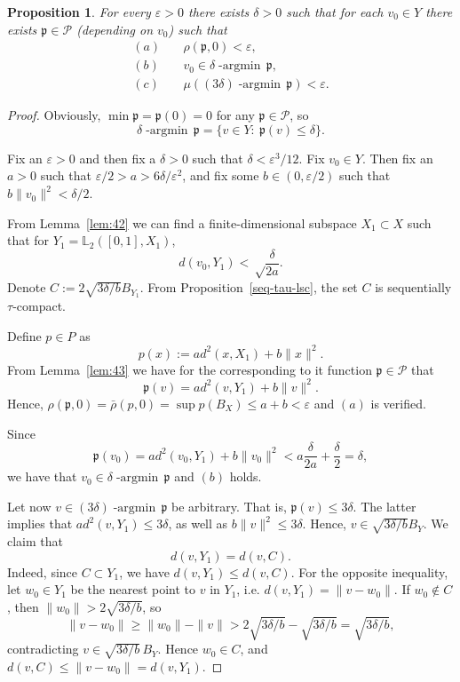 \documentclass[12pt,leqno]{article}
\newtheorem{prop}[thm]{Proposition}   %
\theoremstyle{definition}
\theoremstyle{remark}
\def\L{\mathbb{L}}
\DeclareMathOperator*{\argmin}{-argmin\,}
\begin{document}
    \begin{prop}
        \label{prop:41}
        For every $\varepsilon > 0$ there exists $\delta>0$ such that for each $v_0\in Y$   there exists $\mathfrak{p}\in \mathcal{P}$ (depending on $v_0$)   such that
      \[  \begin{aligned}
            (a)\quad & \rho(\mathfrak{p}, 0) < \varepsilon, \\
            (b)\quad & v_0 \in \delta\argmin  \mathfrak{p}, \\
            (c)\quad & \mu((3\delta)\argmin \mathfrak{p}) < \varepsilon.
        \end{aligned}\]
    \end{prop}
    \begin{proof}
        Obviously, $\min\mathfrak{p} = \mathfrak{p}(0) = 0$ for any $\mathfrak{p} \in \mathcal{P}$, so
        $$
            \delta\argmin \mathfrak{p} = \{v\in Y:\ \mathfrak{p}(v) \le \delta\}.
        $$

        Fix an $\varepsilon > 0$ and then fix a $\delta > 0$ such that
        $            \delta < \varepsilon^3 / 12$. Fix $v_0\in Y$.
                Then fix an $a > 0$ such that
        $
            \varepsilon/2 > a > 6 \delta / \varepsilon^2$, and fix  some $b \in (0,\varepsilon/2)$ such that
        $
            b\|v_0\|^2 < \delta / 2$.


        From Lemma~\ref{lem:42} we can find a finite-dimensional subspace $X_1 \subset X$ such that for $Y_1 = \L_2([0,1],X_1)$,
        $$
            d(v_0,Y_1) < \sqrt\frac{\delta}{2a}.
        $$
        Denote
        $
            C := 2\sqrt{3\delta/b} B_{Y_1}$.
        From Proposition~\ref{seq-tau-lsc}, the set $C$ is sequentially $\tau$-compact.

        Define $p\in P$ as
        $$
            p(x) := a d^2(x,X_1) + b \|x\|^2.
        $$
        From Lemma~\ref{lem:43} we have for the corresponding to it function $\mathfrak{p} \in \mathcal{P}$ that
        $$
            \mathfrak{p}(v) = a d^2(v,Y_1) + b \|v\|^2.
        $$
        Hence, $\rho(\mathfrak{p},0) = \bar\rho(p,0) = \sup p(B_X) \le a + b  < \varepsilon$ and $(a)$ is verified.

       Since
        $$
            \mathfrak{p}(v_0) = a d^2(v_0,Y_1) + b \|v_0\|^2 < a \frac{\delta}{2a} +  \frac{\delta}{2} = \delta,
        $$
       we have that $v_0 \in \delta\argmin \mathfrak{p}$ and $(b)$ holds.

        Let now $v \in (3\delta)\argmin \mathfrak{p}$ be arbitrary. That is, $\mathfrak{p} (v) \le 3\delta$. The latter implies that
        $                a d^2(v,Y_1) \le 3\delta$, as well as $  b \|v\|^2 \le 3\delta$.
              Hence, $v\in \sqrt{3\delta/b}B_Y$. We claim that
        $$
            d(v,Y_1) = d(v,C).
        $$
    Indeed, since $C\subset Y_1$, we have $d(v,Y_1) \le d(v,C)$. For the opposite inequality, let $w_0\in Y_1$ be the nearest point to $v$ in $Y_1$, i.e. $d(v,Y_1) = \|v-w_0\|$. If $w_0\notin C$, then $\|w_0\| > 2\sqrt{3\delta/b}$, so
    $$
        \|v-w_0\| \ge \|w_0\| - \|v\| > 2\sqrt{3\delta/b} - \sqrt{3\delta/b} = \sqrt{3\delta/b},
    $$
    contradicting $v\in \sqrt{3\delta/b}\, B_Y$. Hence $w_0\in C$, and $d(v,C)\le \|v-w_0\| = d(v,Y_1)$.



\end{proof}
\end{document}
